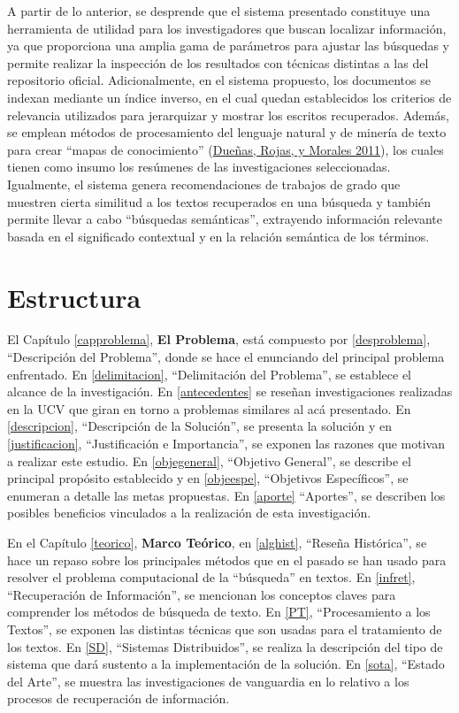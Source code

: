 \documentclass[
  12pt,
  openany]{book}
\begin{document}
A partir de lo anterior, se desprende que el sistema presentado constituye una herramienta de utilidad para los investigadores que buscan localizar información, ya que proporciona una amplia gama de parámetros para ajustar las búsquedas y permite realizar la inspección de los resultados con técnicas distintas a las del repositorio oficial. Adicionalmente, en el sistema propuesto, los documentos se indexan mediante un índice inverso, en el cual quedan establecidos los criterios de relevancia utilizados para jerarquizar y mostrar los escritos recuperados. Además, se emplean métodos de procesamiento del lenguaje natural y de minería de texto para crear ``mapas de conocimiento'' (\protect\hyperlink{ref-dueuxf1as2011}{Dueñas, Rojas, y Morales 2011}), los cuales tienen como insumo los resúmenes de las investigaciones seleccionadas. Igualmente, el sistema genera recomendaciones de trabajos de grado que muestren cierta similitud a los textos recuperados en una búsqueda y también permite llevar a cabo ``búsquedas semánticas'', extrayendo información relevante basada en el significado contextual y en la relación semántica de los términos.

\hypertarget{estructura}{%
\section{Estructura}\label{estructura}}

El Capítulo \ref{capproblema}, \textbf{El Problema}, está compuesto por \ref{desproblema}, ``Descripción del Problema'', donde se hace el enunciando del principal problema enfrentado. En \ref{delimitacion}, ``Delimitación del Problema'', se establece el alcance de la investigación. En \ref{antecedentes} se reseñan investigaciones realizadas en la UCV que giran en torno a problemas similares al acá presentado. En \ref{descripcion}, ``Descripción de la Solución'', se presenta la solución y en \ref{justificacion}, ``Justificación e Importancia'', se exponen las razones que motivan a realizar este estudio. En \ref{objegeneral}, ``Objetivo General'', se describe el principal propósito establecido y en \ref{objeespe}, ``Objetivos Específicos'', se enumeran a detalle las metas propuestas. En \ref{aporte} ``Aportes'', se describen los posibles beneficios vinculados a la realización de esta investigación.

En el Capítulo \ref{teorico}, \textbf{Marco Teórico}, en \ref{alghist}, ``Reseña Histórica'', se hace un repaso sobre los principales métodos que en el pasado se han usado para resolver el problema computacional de la ``búsqueda'' en textos. En \ref{infret}, ``Recuperación de Información'', se mencionan los conceptos claves para comprender los métodos de búsqueda de texto. En \ref{PT}, ``Procesamiento a los Textos'', se exponen las distintas técnicas que son usadas para el tratamiento de los textos. En \ref{SD}, ``Sistemas Distribuidos'', se realiza la descripción del tipo de sistema que dará sustento a la implementación de la solución. En \ref{sota}, ``Estado del Arte'', se muestra las investigaciones de vanguardia en lo relativo a los procesos de recuperación de información.
\end{document}
